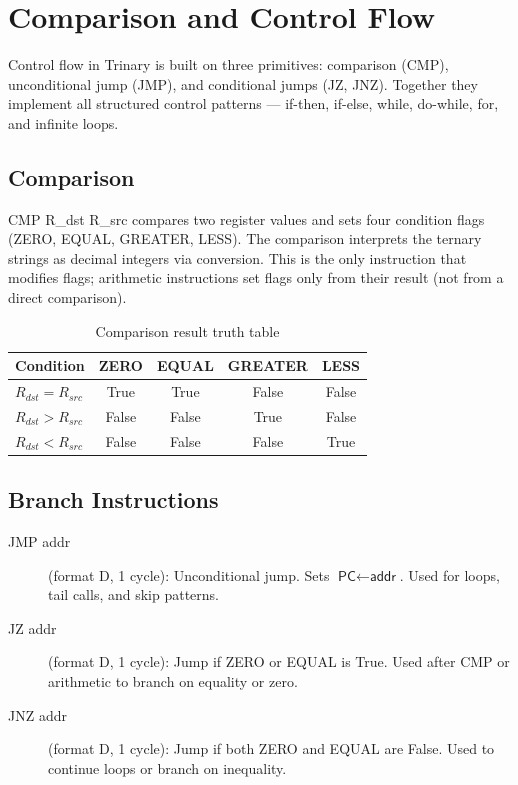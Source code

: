 \documentclass[12pt,a4paper,twoside]{book}
\theoremstyle{trinarytheorem}
\theoremstyle{trinarydefinition}
\newcommand{\code}[1]{\textsf{#1}}
\begin{document}
\chapter{Comparison and Control Flow}
\label{ch:control}

Control flow in Trinary is built on three primitives: comparison (CMP),
unconditional jump (JMP), and conditional jumps (JZ, JNZ). Together they implement
all structured control patterns --- if-then, if-else, while, do-while, for, and
infinite loops.

\section{Comparison}

\code{CMP R\_dst R\_src} compares two register values and sets four condition flags
(ZERO, EQUAL, GREATER, LESS). The comparison interprets the ternary strings as
decimal integers via conversion. This is the only instruction that modifies flags;
arithmetic instructions set flags only from their result (not from a direct
comparison).

\begin{table}[H]
\centering
\caption{Comparison result truth table}
\label{tab:cmptruth}
\begin{tabular}{lcccc}
\toprule
Condition & ZERO & EQUAL & GREATER & LESS \\
\midrule
$R_{dst} = R_{src}$ & True & True & False & False \\
$R_{dst} > R_{src}$ & False & False & True & False \\
$R_{dst} < R_{src}$ & False & False & False & True \\
\bottomrule
\end{tabular}
\end{table}

\section{Branch Instructions}

\begin{description}
    \item[\code{JMP addr}] (format D, 1 cycle): Unconditional jump. Sets
          $\code{PC} \gets \code{addr}$. Used for loops, tail calls, and
          skip patterns.
    \item[\code{JZ addr}] (format D, 1 cycle): Jump if ZERO or EQUAL is True.
          Used after CMP or arithmetic to branch on equality or zero.
    \item[\code{JNZ addr}] (format D, 1 cycle): Jump if both ZERO and EQUAL are
          False. Used to continue loops or branch on inequality.
\end{description}
\end{document}
